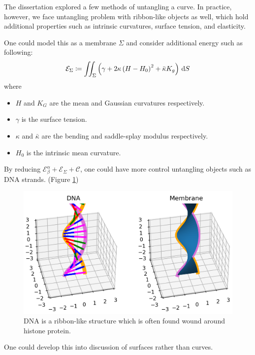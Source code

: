 \documentclass[../dissertation.tex]{subfiles}
\begin{document}
The dissertation explored a few methods of untangling a curve.
In practice, however, we face untangling problem with ribbon-like objects as well,
which hold additional properties such as intrinsic curvatures, surface tension, and elasticity.

One could model this as a membrane $\Sigma$ and consider additional energy such as following\cite{mmb}:
\begin{equation}
    \mathcal{E}_{\Sigma} \coloneqq \iint_{\Sigma} \left( \gamma + 2 \kappa \left( H-H_0 \right)^2 + \bar \kappa K_g \right) \, \text{d} S
\end{equation}
where
\begin{itemize}
    \item $H$ and $K_G$ are the mean and Gaussian curvatures respectively.
    \item $\gamma$ is the surface tension.
    \item $\kappa$ and $\bar \kappa$ are the bending and saddle-splay modulus respectively.
    \item $H_0$ is the intrinsic mean curvature.
\end{itemize}
By reducing $\mathcal{E}_{\beta}^{\alpha} + \mathcal{E}_{\Sigma} + \mathcal{C}$, one could have more control untangling objects such as DNA strands. (Figure \ref{fig: DNA})

\begin{figure}[tbp]
    \centering
    \includegraphics[scale=0.7]{sections/MembraneImgs/dnaMembrane}
    \caption{DNA is a ribbon-like structure which is often found wound around histone protein.\cite{gilchrist_2023}}
    \label{fig: DNA}
\end{figure}

One could develop this into discussion of surfaces rather than curves.
\end{document}
